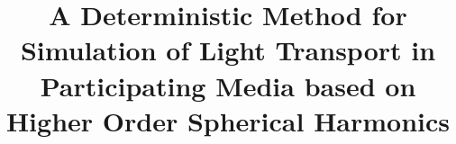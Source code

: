 

\title[Draft]%
{
A Deterministic Method for Simulation of Light Transport in Participating Media based on Higher Order Spherical Harmonics
}




%



